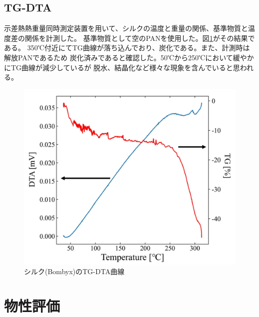 \documentclass[dvipdfmx,12pt,a4paper]{jreport}
\begin{document}
		\section{TG-DTA}
		示差熱熱重量同時測定装置を用いて、シルクの温度と重量の関係、基準物質と温度差の関係を計測した。
		基準物質として空のPANを使用した。図\ref{TG_DTA}がその結果である。
		350℃付近にてTG曲線が落ち込んでおり、炭化である。また、計測時は解放PANであるため
		炭化済みであると確認した。50℃から250℃において緩やかにTG曲線が減少しているが
		脱水、結晶化など様々な現象を含んでいると思われる。
		\begin{figure}[H]
			\centering
			\includegraphics[scale=0.4]{TG_DTA.jpg}
			\caption{シルク(Bombyx)のTG-DTA曲線}
			\label{TG_DTA}
		\end{figure}
		\chapter{物性評価}
\end{document}
